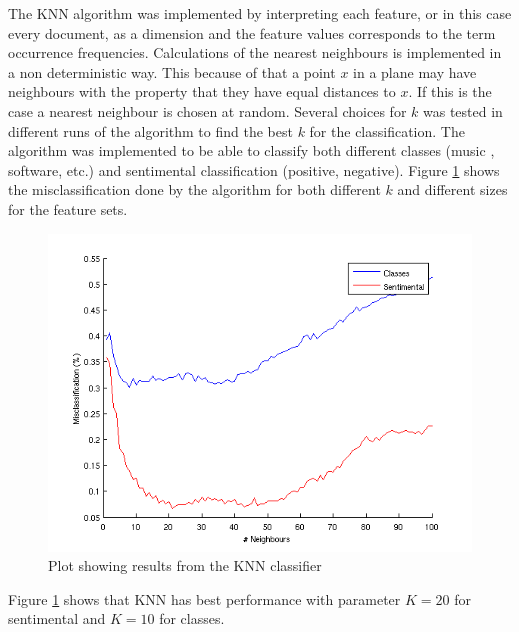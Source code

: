 The KNN algorithm was implemented by interpreting each feature, or in this case
every document, as a dimension and the feature values corresponds to the term
occurrence frequencies. Calculations of the nearest neighbours is
implemented in a non deterministic way. This because of that a point $x$ in a plane
may have neighbours with the property that they have equal distances to
$x$. If this is the case a nearest neighbour is chosen at random. Several choices
for $k$ was tested in different runs of the algorithm to find the best $k$ for
the classification. The algorithm was implemented to be able to classify both
different classes (music , software, etc.) and sentimental classification
(positive, negative). Figure \ref{fig:KNNplot} shows the misclassification done by the
algorithm for both different $k$ and different sizes for the feature sets.
\begin{figure}[h!]
\centering
\includegraphics[scale=0.6]{../Plottar/knn_2000words_testdata100_unigram}
\caption{Plot showing results from the KNN classifier}
\label{fig:KNNplot}
\end{figure}
Figure \ref{fig:KNNplot} shows that KNN has best performance with parameter  $K = 20$ for sentimental and $K = 10$ for classes.


%
